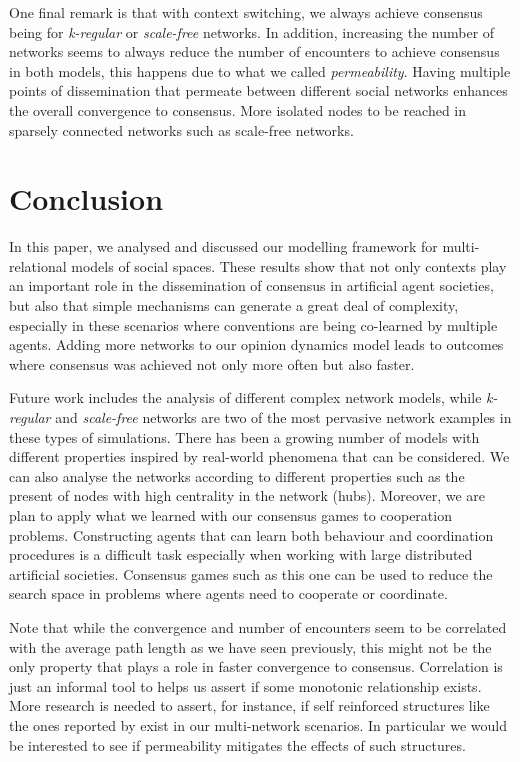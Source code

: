 \documentclass[preprint,number]{elsarticle}
\begin{document}
One final remark is that with context switching, we always achieve consensus being for \textit{k-regular} or \textit{scale-free} networks. In addition, increasing the number of networks seems to always reduce the number of encounters to achieve consensus in both models, this happens due to what we called \textit{permeability}. Having multiple points of dissemination that permeate between different social networks enhances the overall convergence to consensus. More isolated nodes to be reached in sparsely connected networks such as scale-free networks. 

\section{Conclusion}
\label{sec:conclusion-future}
In this paper, we analysed and discussed our modelling framework for multi-relational models of social spaces. These results show that not only contexts play an important role in the dissemination of consensus in artificial agent societies, but also that simple mechanisms can generate a great deal of complexity, especially in these scenarios where conventions are being co-learned by multiple agents. Adding more networks to our opinion dynamics model leads to outcomes where consensus was achieved not only more often but also faster.

Future work includes the analysis of different complex network models, while \textit{k-regular} and \textit{scale-free} networks are two of the most pervasive network examples in these types of simulations. There has been a growing number of models with different properties inspired by real-world phenomena that can be considered. We can also analyse the networks according to different properties such as the present of nodes with high centrality in the network (hubs). Moreover, we are plan to apply what we learned with our consensus games to cooperation problems. Constructing agents that can learn both behaviour and coordination procedures is a difficult task especially when working with large distributed artificial societies. Consensus games such as this one can be used to reduce the search space in problems where agents need to cooperate or coordinate.

Note that while the convergence and number of encounters seem to be correlated with the average path length as we have seen previously, this might not be the only property that plays a role in faster convergence to consensus. Correlation is just an informal tool to helps us assert if some monotonic relationship exists. More research is needed to assert, for instance, if self reinforced structures like the ones reported by \cite{Villatoro2013} exist in our multi-network scenarios. In particular we would be interested to see if permeability mitigates the effects of such structures.
\end{document}
